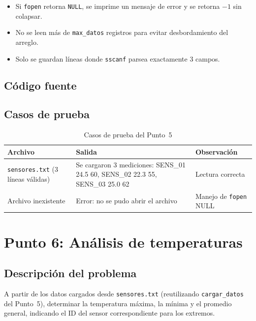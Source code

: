 \documentclass[12pt, letterpaper]{article}
\begin{document}
\begin{itemize}
    \item Si \texttt{fopen} retorna \texttt{NULL}, se imprime un mensaje de
          error y se retorna $-1$ sin colapsar.
    \item No se leen más de \texttt{max\_datos} registros para evitar
          desbordamiento del arreglo.
    \item Solo se guardan líneas donde \texttt{sscanf} parsea exactamente
          3 campos.
\end{itemize}

\subsection{Código fuente}



\subsection{Casos de prueba}

\begin{table}[H]
\centering
\small
\begin{tabular}{|p{3.5cm}|p{5.5cm}|p{4cm}|}
\hline
\textbf{Archivo} & \textbf{Salida} & \textbf{Observación} \\
\hline
\texttt{sensores.txt} (3 líneas válidas) &
Se cargaron 3 mediciones: SENS\_01 24.5 60, SENS\_02 22.3 55, SENS\_03 25.0 62 &
Lectura correcta \\
\hline
Archivo inexistente &
Error: no se pudo abrir el archivo &
Manejo de \texttt{fopen} NULL \\
\hline
\end{tabular}
\caption{Casos de prueba del Punto~5}
\end{table}

\section{Punto 6: Análisis de temperaturas}

\subsection{Descripción del problema}

A partir de los datos cargados desde \texttt{sensores.txt} (reutilizando
\texttt{cargar\_datos} del Punto~5), determinar la temperatura máxima, la
mínima y el promedio general, indicando el ID del sensor correspondiente para
los extremos.
\end{document}
